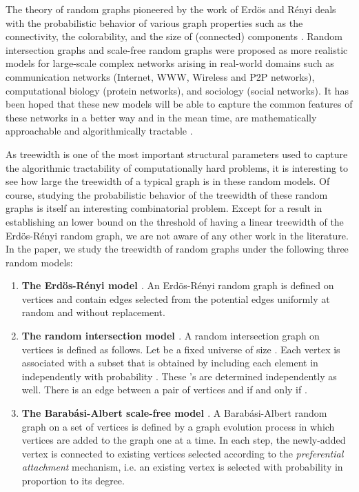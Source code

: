 \documentclass[11pt]{article}
\begin{document}
The theory of random graphs pioneered by the work of Erd\"{o}s and R\'{enyi} 
\cite{erdos60} deals with the probabilistic behavior of various graph properties such as the connectivity, the colorability, and the size of (connected) components
\cite{erdos60,bollobas01,achlioptas99sharp,friedgut99}.
Random intersection graphs and scale-free random graphs were proposed 
as more realistic models for large-scale complex networks arising in
real-world domains such as communication networks (Internet, WWW, Wireless and P2P networks), computational biology (protein networks), and sociology 
(social networks). It has been hoped that these new models will be able to capture    
the common features of these networks in a better way and in the mean time, are mathematically
approachable and algorithmically tractable \cite{cooper05,ferrante08tcs,gao09tcs,silvio09stoc}.  

As treewidth is one of the most important structural parameters used to capture the 
algorithmic tractability of computationally hard problems, it is interesting 
to see how large the treewidth of  a typical graph is in these random models. Of course, studying the probabilistic behavior of the treewidth of these random graphs is itself an interesting combinatorial problem. 
Except for a result in \cite{kloks94} establishing an lower bound  on the threshold of having a linear treewidth of the Erd\"{o}s-R\'{e}nyi random graph, we are not aware of any other work in the literature. In the paper, we study the treewidth of random graphs under 
the following three random models:
\begin{enumerate}
\item \textbf{The Erd\"{o}s-R\'{e}nyi model \cite{bollobas01,erdos60}}. An Erd\"{o}s-R\'{e}nyi random graph  is defined on  vertices and contain  edges selected from the 
 potential edges uniformly at random and without replacement.
\item \textbf{The random intersection model \cite{karonski99cpc}}. A random intersection graph  on  vertices is defined as follows. Let  be a fixed universe of size . Each vertex   is associated with a subset  that is obtained by including each element in  independently with probability . These 's are determined independently as well. There is an edge between a pair of vertices  and  if and only if . 
\item \textbf{The Barab\'{a}si-Albert scale-free model \cite{albert02complex}}. 
A Barab\'{a}si-Albert random graph   on a set of  vertices  is defined by a graph evolution process in which vertices are added to the graph one at a time.
In each step, the newly-added vertex is connected to
 existing vertices selected according to 
the \textit{preferential attachment} mechanism, i.e. an existing vertex is selected with probability in proportion to its degree.          
\end{enumerate} 
\end{document}
